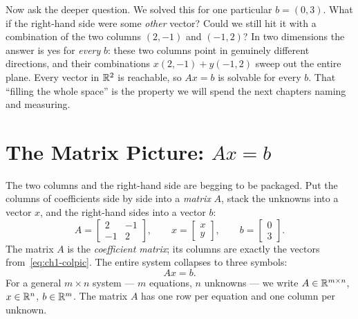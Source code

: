 Now ask the deeper question. We solved this for one particular $b=(0,3)$. What if the right-hand side were some \emph{other} vector? Could we still hit it with a combination of the two columns $(2,-1)$ and $(-1,2)$? In two dimensions the answer is yes for \emph{every} $b$: these two columns point in genuinely different directions, and their combinations $x(2,-1)+y(-1,2)$ sweep out the entire plane. Every vector in $\mathbb{R}^2$ is reachable, so $Ax=b$ is solvable for every $b$. That ``filling the whole space'' is the property we will spend the next chapters naming and measuring.



\section{The Matrix Picture: \texorpdfstring{$Ax=b$}{Ax=b}}

The two columns and the right-hand side are begging to be packaged. Put the columns of coefficients side by side into a \emph{matrix} $A$, stack the unknowns into a vector $x$, and the right-hand sides into a vector $b$:
\[
A=\begin{bmatrix} 2 & -1\\ -1 & 2\end{bmatrix},\qquad
x=\begin{bmatrix} x\\ y\end{bmatrix},\qquad
b=\begin{bmatrix} 0\\ 3\end{bmatrix}.
\]
The matrix $A$ is the \emph{coefficient matrix}; its columns are exactly the vectors from~\eqref{eq:ch1-colpic}. The entire system collapses to three symbols:
\[
\boxed{\,Ax=b.\,}
\]
For a general $m\times n$ system --- $m$ equations, $n$ unknowns --- we write $A\in\mathbb{R}^{m\times n}$, $x\in\mathbb{R}^n$, $b\in\mathbb{R}^m$. The matrix $A$ has one row per equation and one column per unknown.

